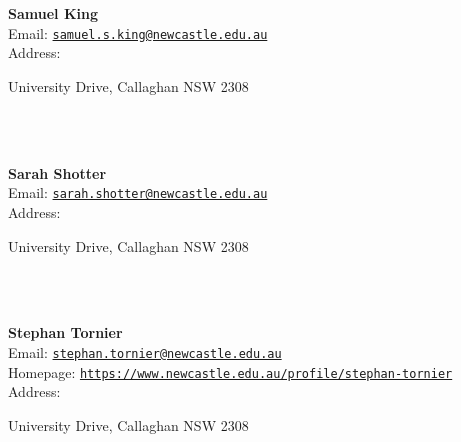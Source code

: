 \documentclass[a4paper,11pt]{report}
\begin{document}
\begin{titlepage}
\mbox{}\\
{\mbox{}\\
\small \noindent \textbf{ Samuel King\\
   }  Email: \href{mailto://samuel.s.king@newcastle.edu.au} {\texttt{samuel.s.king@newcastle.edu.au}}\\
  Address: \begin{minipage}[t]{8cm}\noindent
 University Drive, Callaghan NSW 2308\\
 \end{minipage}
}\\
{\mbox{}\\
\small \noindent \textbf{ Sarah Shotter\\
   }  Email: \href{mailto://sarah.shotter@newcastle.edu.au} {\texttt{sarah.shotter@newcastle.edu.au}}\\
  Address: \begin{minipage}[t]{8cm}\noindent
 University Drive, Callaghan NSW 2308\\
 \end{minipage}
}\\
{\mbox{}\\
\small \noindent \textbf{ Stephan Tornier\\
    }  Email: \href{mailto://stephan.tornier@newcastle.edu.au} {\texttt{stephan.tornier@newcastle.edu.au}}\\
  Homepage: \href{https://www.newcastle.edu.au/profile/stephan-tornier} {\texttt{https://www.newcastle.edu.au/profile/stephan-tornier}}\\
  Address: \begin{minipage}[t]{8cm}\noindent
 University Drive, Callaghan NSW 2308\\
 \end{minipage}
}\\
\end{titlepage}
\end{document}
